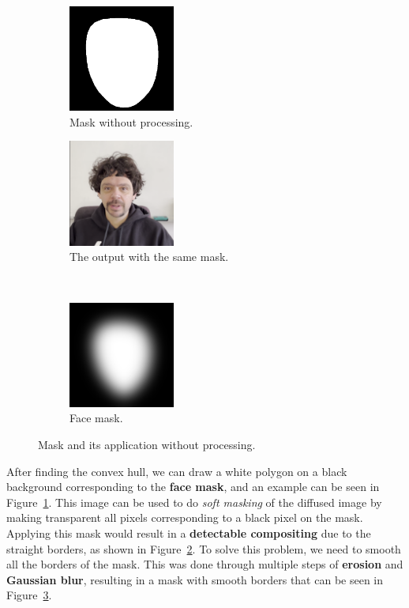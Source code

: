 \documentclass[sn-mathphys,Numbered]{sn-jnl}
\theoremstyle{thmstyleone}%
\theoremstyle{thmstyletwo}%
\theoremstyle{thmstylethree}%
\begin{document}
\begin{figure}[t]
	\centering
	\begin{subfigure}[b]{0.5\textwidth}
		\centering
		\includegraphics[width=3.5cm, keepaspectratio]{img/project_img/mask.png}
		\caption{Mask without processing.}\label{fig:mask-noblur}
	\end{subfigure}%
	\hfill
	\begin{subfigure}[b]{0.5\textwidth}
		\centering
		\includegraphics[width=3.5cm, keepaspectratio]{img/project_img/final-erorr.png}
		\caption{The output with the same mask.}\label{fig:mask-final-error}
	\end{subfigure}
 \\ \vspace{0.4cm}
 	\begin{subfigure}[b]{0.5\textwidth}
		\centering
		\includegraphics[width=3.5cm, keepaspectratio]{img/project_img/mask-blur.png}
		\caption{Face mask.}\label{fig:mask}
	\end{subfigure}
 \caption{Mask and its application without processing.}\label{fig:eroor-mediapipe}
\end{figure}


After finding the convex hull, we can draw a white polygon on a black background corresponding to the \textbf{face mask},  and an example can be seen in Figure~\ref{fig:mask-noblur}. 
This image can be used to do \emph{soft masking} of the diffused image by making transparent all  pixels corresponding to a black pixel on the mask.  Applying this mask would result in a \textbf{detectable compositing} due to the straight borders, 
as shown in Figure~\ref{fig:mask-final-error}.  To solve this problem, we need to smooth all the borders of the mask.  This was done through multiple steps of \textbf{erosion} and \textbf{Gaussian blur}, 
resulting in a mask with smooth borders that can be seen in Figure~\ref{fig:mask}.
\end{document}
